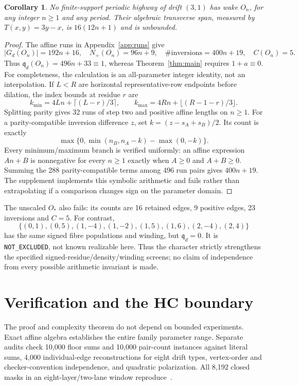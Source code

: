 \documentclass[11pt]{article}
\newtheorem{corollary}[theorem]{Corollary}
\newcommand{\qd}{\mathfrak q_d}
\begin{document}
\begin{corollary}\label{cor:family}
No finite-support periodic highway of drift $(3,1)$ has wake $O_n$, for any
integer $n\ge1$ and any period. Their algebraic transverse span, measured by
$T(x,y)=3y-x$, is $16(12n+1)$ and is unbounded.
\end{corollary}
\begin{proof}
The affine runs in Appendix~\ref{app:runs} give
\[
 |G_d(O_n)|=192n+16,\quad N_+(O_n)=96n+9,\quad
 \#\text{inversions}=400n+19,\quad C(O_n)=5.
\]
Thus $\qd(O_n)=496n+33\equiv1$, whereas Theorem~\ref{thm:main} requires
$1+a\equiv0$. For completeness, the calculation is an all-parameter integer
identity, not an interpolation. If $L<R$ are horizontal representative-row
endpoints before dilation, the index bounds at residue $r$ are
\[
 k_{\min}=4Ln+\lceil(L-r)/3\rceil,\qquad
 k_{\max}=4Rn+\lfloor(R-1-r)/3\rfloor.
\]
Splitting parity gives 32 runs of step two and positive affine lengths on
$n\ge1$. For a parity-compatible inversion difference $z$, set
$k=(z-s_A+s_B)/2$. Its count is exactly
\begin{equation}
 \max\{0,\min(n_B,n_A-k)-\max(0,-k)\}.\label{eq:affine-pair}
\end{equation}
Every minimum/maximum branch is verified uniformly: an affine expression
$An+B$ is nonnegative for every $n\ge1$ exactly when $A\ge0$ and $A+B\ge0$.
Summing the 288 parity-compatible terms among 496 run pairs gives $400n+19$.
The supplement implements this symbolic arithmetic and fails rather than
extrapolating if a comparison changes sign on the parameter domain.
\end{proof}

The unscaled $O_*$ also fails: its counts are 16 retained edges, 9 positive
edges, 23 inversions and $C=5$. For contrast,
\[
 \{(0,1),(0,5),(1,-4),(1,-2),(1,5),(1,6),(2,-4),(2,4)\}
\]
has the same signed fibre populations and winding, but $\qd=0$.
It is \texttt{NOT\_EXCLUDED}, not known realizable here. Thus the character
strictly strengthens the specified signed-residue/density/winding screens;
no claim of independence from every possible arithmetic invariant is made.

\section{Verification and the HC boundary}
The proof and complexity theorem do not depend on bounded experiments. Exact
affine algebra establishes the entire family parameter range. Separate audits
check 10,000 floor sums and 10,000 pair-count instances against literal sums,
4,000 individual-edge reconstructions for eight drift types, vertex-order and
checker-convention independence, and quadratic polarization.
All 8,192 closed masks in an eight-layer/two-lane window reproduce~\cite{M}.
\end{document}
